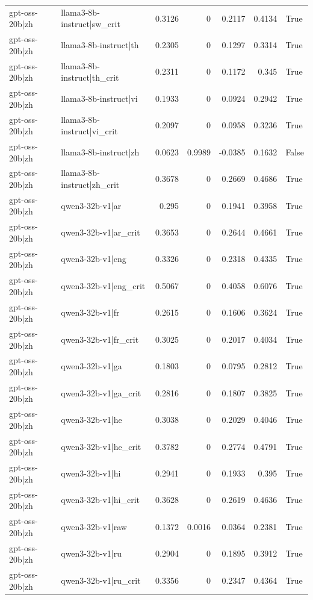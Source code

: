 \begin{table}
\begin{tabular}{l l r r r r l}
gpt-oss-20b|zh & llama3-8b-instruct|sw_crit & 0.3126 & 0 & 0.2117 & 0.4134 & True \\
gpt-oss-20b|zh & llama3-8b-instruct|th & 0.2305 & 0 & 0.1297 & 0.3314 & True \\
gpt-oss-20b|zh & llama3-8b-instruct|th_crit & 0.2311 & 0 & 0.1172 & 0.345 & True \\
gpt-oss-20b|zh & llama3-8b-instruct|vi & 0.1933 & 0 & 0.0924 & 0.2942 & True \\
gpt-oss-20b|zh & llama3-8b-instruct|vi_crit & 0.2097 & 0 & 0.0958 & 0.3236 & True \\
gpt-oss-20b|zh & llama3-8b-instruct|zh & 0.0623 & 0.9989 & -0.0385 & 0.1632 & False \\
gpt-oss-20b|zh & llama3-8b-instruct|zh_crit & 0.3678 & 0 & 0.2669 & 0.4686 & True \\
gpt-oss-20b|zh & qwen3-32b-v1|ar & 0.295 & 0 & 0.1941 & 0.3958 & True \\
gpt-oss-20b|zh & qwen3-32b-v1|ar_crit & 0.3653 & 0 & 0.2644 & 0.4661 & True \\
gpt-oss-20b|zh & qwen3-32b-v1|eng & 0.3326 & 0 & 0.2318 & 0.4335 & True \\
gpt-oss-20b|zh & qwen3-32b-v1|eng_crit & 0.5067 & 0 & 0.4058 & 0.6076 & True \\
gpt-oss-20b|zh & qwen3-32b-v1|fr & 0.2615 & 0 & 0.1606 & 0.3624 & True \\
gpt-oss-20b|zh & qwen3-32b-v1|fr_crit & 0.3025 & 0 & 0.2017 & 0.4034 & True \\
gpt-oss-20b|zh & qwen3-32b-v1|ga & 0.1803 & 0 & 0.0795 & 0.2812 & True \\
gpt-oss-20b|zh & qwen3-32b-v1|ga_crit & 0.2816 & 0 & 0.1807 & 0.3825 & True \\
gpt-oss-20b|zh & qwen3-32b-v1|he & 0.3038 & 0 & 0.2029 & 0.4046 & True \\
gpt-oss-20b|zh & qwen3-32b-v1|he_crit & 0.3782 & 0 & 0.2774 & 0.4791 & True \\
gpt-oss-20b|zh & qwen3-32b-v1|hi & 0.2941 & 0 & 0.1933 & 0.395 & True \\
gpt-oss-20b|zh & qwen3-32b-v1|hi_crit & 0.3628 & 0 & 0.2619 & 0.4636 & True \\
gpt-oss-20b|zh & qwen3-32b-v1|raw & 0.1372 & 0.0016 & 0.0364 & 0.2381 & True \\
gpt-oss-20b|zh & qwen3-32b-v1|ru & 0.2904 & 0 & 0.1895 & 0.3912 & True \\
gpt-oss-20b|zh & qwen3-32b-v1|ru_crit & 0.3356 & 0 & 0.2347 & 0.4364 & True \\

\end{tabular}
\end{table}
